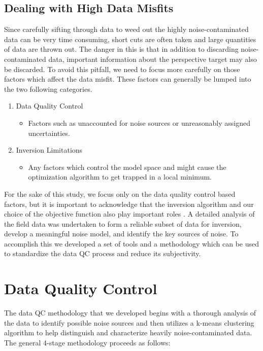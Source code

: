 \documentclass[final,authoryear,5p,times,twocolumn]{elsarticle}
\begin{document}
\subsection{Dealing with High Data Misfits}
\label{Dealing_With_High_Misfits}
Since carefully sifting through data to weed out the highly noise-contaminated data can be very time consuming, short cuts are often taken and large quantities of data are thrown out. The danger in this is that in addition to discarding noise-contaminated data, important information about the perspective target may also be discarded. To avoid this pitfall, we need to focus more carefully on those factors which affect the data misfit. These factors can generally be lumped into the two following categories.

\begin{enumerate}
   \item Data Quality Control
      \begin{itemize}
         \item Factors such as unaccounted for noise sources or unreasonably assigned uncertainties.
      \end{itemize}
   \item Inversion Limitations
      \begin{itemize}
         \item Any factors which control the model space and might cause the optimization algorithm to get trapped in a local minimum.
      \end{itemize}
\end{enumerate}

For the sake of this study, we focus only on the data quality control based factors, but it is important to acknowledge that the inversion algorithm and our choice of the objective function also play important roles \citep{Farquharson1998,Oldenburg2005}. A detailed analysis of the field data was undertaken to form a reliable subset of data for inversion, develop a meaningful noise model, and identify the key sources of noise. To accomplish this we developed a set of tools and a methodology which can be used to standardize the data QC process and reduce its subjectivity.

\section{Data Quality Control}
\label{Data_Quality_Control}

The data QC methodology that we developed begins with a thorough analysis of the data to identify possible noise sources and then utilizes a k-means clustering algorithm to help distinguish and characterize heavily noise-contaminated data. The general 4-stage methodology proceeds as follows:
\end{document}
